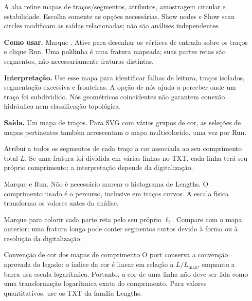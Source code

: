 \label{sec:maps}
A aba reúne mapas de traços/segmentos, atributos, amostragem circular e estabilidade. Escolha somente as opções necessárias. Show nodes e Show scan circles modificam as saídas relacionadas; não são análises independentes.

\textbf{Como usar.} Marque . Ative  para desenhar os vértices de entrada sobre os traços e clique Run. Uma polilinha é uma fratura mapeada; suas partes retas são segmentos, não necessariamente fraturas distintas.

\textbf{Interpretação.} Use esse mapa para identificar falhas de leitura, traços isolados, segmentação excessiva e fronteiras. A opção de nós ajuda a perceber onde um traço foi subdividido. Nós geométricos coincidentes não garantem conexão hidráulica nem classificação topológica.

\textbf{Saída.} Um mapa de traços. Para SVG com vários grupos de cor, as seleções de mapas pertinentes também acrescentam o mapa multicolorido, uma vez por Run.

Atribui a todos os segmentos de cada traço a cor associada ao seu comprimento total \(L\). Se uma fratura foi dividida em várias linhas no TXT, cada linha terá seu próprio comprimento; a interpretação depende da digitalização.

Marque  e Run. Não é necessário marcar o histograma de Lengths. O comprimento usado é o percurso, inclusive em traços curvos. A escala física transforma os valores antes da análise.

Marque  para colorir cada parte reta pelo seu próprio \(\ell_i\). Compare com o mapa anterior: uma fratura longa pode conter segmentos curtos devido à forma ou à resolução da digitalização.

\begin{note}{Convenção de cor dos mapas de comprimento}
O port conserva a convenção aprovada do legado: o índice da cor é linear em relação a \(L/L_{\max}\), enquanto a barra usa escala logarítmica. Portanto, a cor de uma linha não deve ser lida como uma transformação logarítmica exata do comprimento. Para valores quantitativos, use os TXT da família Lengths.
\end{note}

